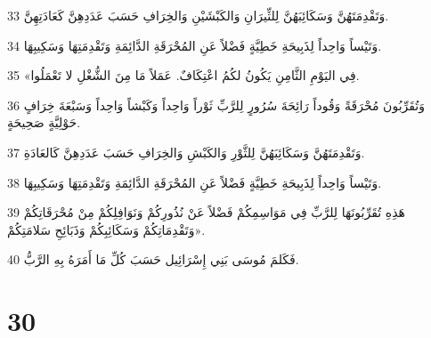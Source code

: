 \par 33 وَتَقْدِمَتَهُنَّ وَسَكَائِبَهُنَّ لِلثِّيرَانِ وَالكَبْشَيْنِ وَالخِرَافِ حَسَبَ عَدَدِهِنَّ كَعَادَتِهِنَّ.
\par 34 وَتَيْساً وَاحِداً لِذَبِيحَةِ خَطِيَّةٍ فَضْلاً عَنِ المُحْرَقَةِ الدَّائِمَةِ وَتَقْدِمَتِهَا وَسَكِيبِهَا.
\par 35 «فِي اليَوْمِ الثَّامِنِ يَكُونُ لكُمُ اعْتِكَافٌ. عَمَلاً مَا مِنَ الشُّغْلِ لا تَعْمَلُوا.
\par 36 وَتُقَرِّبُونَ مُحْرَقَةً وَقُوداً رَائِحَةَ سُرُورٍ لِلرَّبِّ ثَوْراً وَاحِداً وَكَبْشاً وَاحِداً وَسَبْعَةَ خِرَافٍ حَوْلِيَّةٍ صَحِيحَةٍ.
\par 37 وَتَقْدِمَتَهُنَّ وَسَكَائِبَهُنَّ لِلثَّوْرِ وَالكَبْشِ وَالخِرَافِ حَسَبَ عَدَدِهِنَّ كَالعَادَةِ.
\par 38 وَتَيْساً وَاحِداً لِذَبِيحَةِ خَطِيَّةٍ فَضْلاً عَنِ المُحْرَقَةِ الدَّائِمَةِ وَتَقْدِمَتِهَا وَسَكِيبِهَا.
\par 39 هَذِهِ تُقَرِّبُونَهَا لِلرَّبِّ فِي مَوَاسِمِكُمْ فَضْلاً عَنْ نُذُورِكُمْ وَنَوَافِلِكُمْ مِنْ مُحْرَقَاتِكُمْ وَتَقْدِمَاتِكُمْ وَسَكَائِبِكُمْ وَذَبَائِحِ سَلامَتِكُمْ».
\par 40 فَكَلمَ مُوسَى بَنِي إِسْرَائِيل حَسَبَ كُلِّ مَا أَمَرَهُ بِهِ الرَّبُّ.

\chapter{30}

